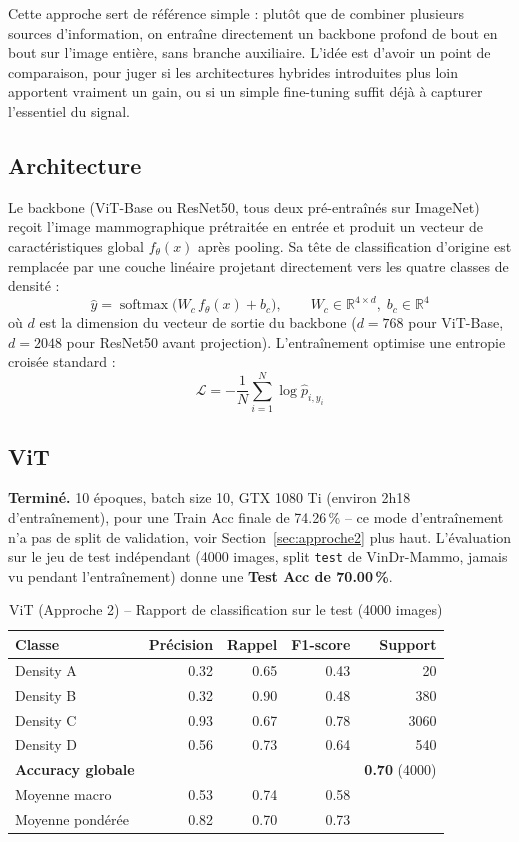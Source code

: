\documentclass[12pt,a4paper]{report}
\begin{document}
Cette approche sert de référence simple : plutôt que de combiner plusieurs
sources d'information, on entraîne directement un backbone profond de bout
en bout sur l'image entière, sans branche auxiliaire. L'idée est d'avoir un
point de comparaison, pour juger si les architectures hybrides introduites
plus loin apportent vraiment un gain, ou si un simple fine-tuning suffit
déjà à capturer l'essentiel du signal.

\subsection{Architecture}
Le backbone (ViT-Base ou ResNet50, tous deux pré-entraînés sur ImageNet) reçoit
l'image mammographique prétraitée en entrée et produit un vecteur de
caractéristiques global $f_\theta(x)$ après pooling. Sa tête de classification
d'origine est remplacée par une couche linéaire projetant directement vers les
quatre classes de densité :
\[
  \hat{y} = \operatorname{softmax}\big(W_c\, f_\theta(x) + b_c\big), \qquad
  W_c \in \mathbb{R}^{4 \times d}, \; b_c \in \mathbb{R}^4
\]
où $d$ est la dimension du vecteur de sortie du backbone ($d{=}768$ pour
ViT-Base, $d{=}2048$ pour ResNet50 avant projection). L'entraînement optimise
une entropie croisée standard :
\[
  \mathcal{L} = -\frac{1}{N}\sum_{i=1}^{N} \log \hat{p}_{i, y_i}
\]

\subsection{ViT}
\textbf{Terminé.} 10 époques, batch size 10, GTX 1080 Ti (environ 2h18
d'entraînement), pour une Train Acc finale de 74.26\,\% -- ce mode
d'entraînement n'a pas de split de validation, voir Section~\ref{sec:approche2}
plus haut. L'évaluation sur le jeu de test indépendant (4000 images, split
\texttt{test} de VinDr-Mammo, jamais vu pendant l'entraînement) donne une
\textbf{Test Acc de 70.00\,\%}.

\begin{table}[h]
\centering
\caption{ViT (Approche 2) -- Rapport de classification sur le test (4000 images)}
\begin{tabular}{lrrrr}
\toprule
Classe & Précision & Rappel & F1-score & Support \\
\midrule
Density A & 0.32 & 0.65 & 0.43 & 20 \\
Density B & 0.32 & 0.90 & 0.48 & 380 \\
Density C & 0.93 & 0.67 & 0.78 & 3060 \\
Density D & 0.56 & 0.73 & 0.64 & 540 \\
\midrule
\textbf{Accuracy globale} & \multicolumn{3}{c}{} & \textbf{0.70} (4000) \\
Moyenne macro & 0.53 & 0.74 & 0.58 & \\
Moyenne pondérée & 0.82 & 0.70 & 0.73 & \\
\bottomrule
\end{tabular}
\end{table}
\end{document}
